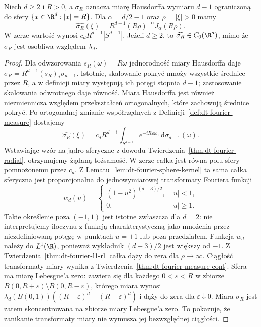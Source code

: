 \begin{stwierdzenie}
\label{prop:dt-fourier-sphere-measure}
Niech $d\ge2$ i $R>0$, a $\sigma_R$ oznacza miarę
Hausdorffa wymiaru $d-1$ ograniczoną do sfery
$\{x\in\R^d:|x|=R\}$. Dla $\alpha=d/2-1$ oraz
$\rho=|\xi|>0$ mamy
\[
 \widehat{\sigma_R}(\xi)
 =R^{d-1}(R\rho)^{-\alpha}J_\alpha(R\rho).
\]
W zerze wartość wynosi $c_d R^{d-1}|S^{d-1}|$.
Jeżeli $d\ge2$, to $\widehat{\sigma_R}\in C_0(\R^d)$,
mimo że $\sigma_R$ jest osobliwa względem $\lambda_d$.
\end{stwierdzenie}
\begin{proof}
Dla odwzorowania $s_R(\omega)=R\omega$ jednorodność
miary Hausdorffa daje
$\sigma_R=R^{d-1}(s_R)_*\sigma_{d-1}$.
Istotnie, skalowanie pokryć mnoży wszystkie średnice
przez $R$, a w definicji miary występują ich potęgi
stopnia $d-1$; zastosowanie skalowania odwrotnego
daje równość. Miara Hausdorffa jest również niezmiennicza
względem przekształceń ortogonalnych, które zachowują
średnice pokryć. Po ortogonalnej zmianie współrzędnych
z Definicji~\ref{def:dt-fourier-measure} dostajemy
\[
 \widehat{\sigma_R}(\xi)
 =c_dR^{d-1}\int_{S^{d-1}}e^{-iR\rho\omega_1}
 \,\mathrm d\sigma_{d-1}(\omega).
\]
Wstawiając wzór na jądro sferyczne z dowodu
Twierdzenia~\ref{thm:dt-fourier-radial}, otrzymujemy
żądaną tożsamość. W zerze całka jest równa polu sfery
pomnożonemu przez $c_d$.
Z Lematu~\ref{lem:dt-fourier-sphere-kernel} ta sama
całka sferyczna jest proporcjonalna do jednowymiarowej
transformaty Fouriera funkcji
\[
 w_d(u)=
 \begin{cases}
 (1-u^2)^{(d-3)/2},& |u|<1,\\
 0,& |u|\ge1.
 \end{cases}
\]
Takie określenie poza $(-1,1)$ jest istotne zwłaszcza
dla $d=2$: nie interpretujemy iloczynu z funkcją
charakterystyczną jako mnożenia przez niezdefiniowaną
potęgę w punktach $u=\pm1$ lub poza przedziałem.
Funkcja $w_d$ należy do $L^1(\R)$, ponieważ wykładnik
$(d-3)/2$ jest większy od $-1$.
Z Twierdzenia~\ref{thm:dt-fourier-l1-rl} całka dąży
do zera dla $\rho\to\infty$.
Ciągłość transformaty miary wynika z
Twierdzenia~\ref{thm:dt-fourier-measure-cont}.
Sfera ma miarę Lebesgue'a zero: zawiera się dla
każdego $0<\varepsilon<R$ w zbiorze
$B(0,R+\varepsilon)\setminus B(0,R-\varepsilon)$,
którego miara wynosi
$\lambda_d(B(0,1))((R+\varepsilon)^d-(R-\varepsilon)^d)$
i dąży do zera dla $\varepsilon\downarrow0$.
Miara $\sigma_R$ jest zatem skoncentrowana na zbiorze
miary Lebesgue'a zero. To pokazuje, że zanikanie
transformaty miary nie wymusza jej bezwzględnej
ciągłości.
\end{proof}

